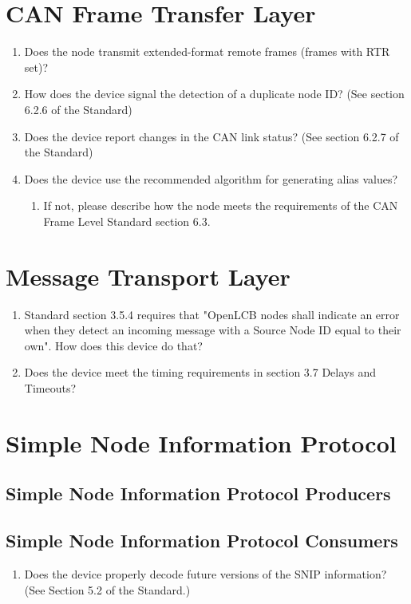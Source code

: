 \section{CAN Frame Transfer Layer}
\begin{enumerate}
    \item Does the node transmit extended-format remote frames (frames with RTR set)?
    \item How does the device signal the detection of a duplicate node ID?
            (See section 6.2.6 of the Standard)
    \item Does the device report changes in the CAN link status? 
            (See section 6.2.7 of the Standard)
    \item Does the device use the recommended algorithm for generating alias values?
        \begin{enumerate}
            \item If not, please describe how the node meets the requirements of the 
                CAN Frame Level Standard section 6.3.
        \end{enumerate}
\end{enumerate}

\section{Message Transport Layer}
\begin{enumerate}
    \item Standard section 3.5.4 requires that "OpenLCB nodes shall indicate an 
        error when they detect an incoming message with a Source Node ID
        equal to their own". How does this device do that?
    \item Does the device meet the timing requirements in section 3.7 Delays and Timeouts?
\end{enumerate}

\section{Simple Node Information Protocol}
\subsection{Simple Node Information Protocol Producers}

\subsection{Simple Node Information Protocol Consumers}
\begin{enumerate}
    \item Does the device properly decode future versions of the SNIP
        information? (See Section 5.2 of the Standard.)
\end{enumerate}


